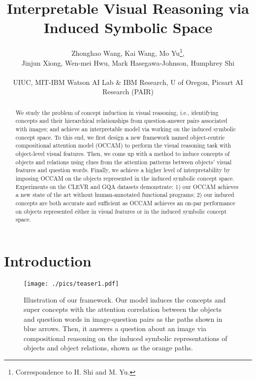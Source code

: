 \documentclass[10pt,twocolumn,letterpaper]{article}
\begin{document}
\title{Interpretable Visual Reasoning via Induced Symbolic Space}

\author{Zhonghao Wang, Kai Wang, Mo Yu\thanks{Correspondence to H. Shi and M. Yu.},  \\
Jinjun Xiong, Wen-mei Hwu, Mark Hasegawa-Johnson, Humphrey Shi\footnotemark[1]\\
\\

{\small UIUC, MIT-IBM Watson AI Lab \& IBM Research, U of Oregon, Picsart AI Research (PAIR)}}

\maketitle
\ificcvfinal\thispagestyle{empty}\fi

\begin{abstract}
We study the problem of concept induction in visual reasoning, i.e., identifying concepts and their hierarchical relationships from question-answer pairs associated with images; and achieve an interpretable model via working on the induced symbolic concept space.
To this end, we first design a new framework named object-centric compositional attention model (OCCAM) to perform the visual reasoning task with object-level visual features. Then, we come up with a method to induce concepts of objects and relations using clues from the attention patterns between objects' visual features and question words.
Finally, we achieve a higher level of interpretability by imposing OCCAM on the objects represented in the induced symbolic concept space.
Experiments on the CLEVR and GQA datasets demonstrate: 1) our OCCAM achieves a new state of the art without human-annotated functional programs; 2) our induced concepts are both accurate and sufficient as OCCAM achieves an on-par performance on objects represented either in visual features or in the induced symbolic concept space.
\end{abstract}


\vspace{-3mm}
\section{Introduction}

\begin{figure}[t]
\centering
\texttt{[image: ./pics/teaser1.pdf]}
\vspace{-3mm}
\caption{\small{Illustration of our framework. Our model induces the concepts and super concepts with the attention correlation between the objects and question words in image-question pairs as the paths shown in blue arrows. Then, it answers a question about an image via compositional reasoning on the induced symbolic representations of objects and object relations, shown as the orange paths.}}
\label{teaser}
\vspace{-6mm}
\end{figure}
\end{document}
